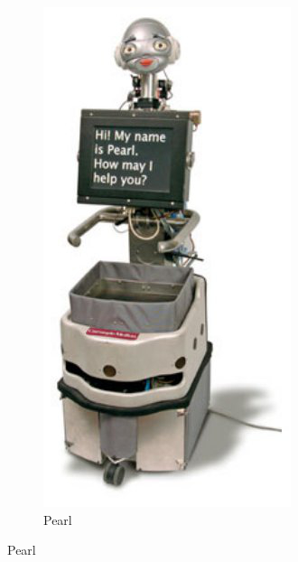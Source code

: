 \begin{figure}[h]
        \centering
        \begin{subfigure}[h]{0.2\textwidth}
                \includegraphics[width=\textwidth]{./img/pearl}
                \caption{Pearl}

\end{subfigure}
\end{figure}
